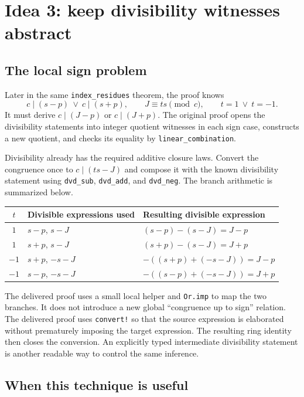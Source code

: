 \documentclass[11pt,letterpaper]{article}
\newcommand{\code}[1]{\nolinkurl{#1}}
\begin{document}
\section{Idea 3: keep divisibility witnesses abstract}

\subsection{The local sign problem}

Later in the same \code{index_residues} theorem, the proof knows
\[
 c\mid(s-p)\ \lor\ c\mid(s+p),
 \qquad J\equiv ts\pmod c,
 \qquad t=1\ \lor\ t=-1.
\]
It must derive $c\mid(J-p)$ or $c\mid(J+p)$. The original proof opens the
divisibility statements into integer quotient witnesses in each sign case,
constructs a new quotient, and checks its equality by
\code{linear_combination}.

Divisibility already has the required additive closure laws. Convert the
congruence once to $c\mid(ts-J)$ and compose it with the known divisibility
statement using \code{dvd_sub}, \code{dvd_add}, and \code{dvd_neg}. The branch
arithmetic is summarized below.

\begin{center}
\begin{tabular}{@{}cll@{}}
\toprule
$t$ & Divisible expressions used & Resulting divisible expression \\
\midrule
$1$ & $s-p$, $s-J$ & $(s-p)-(s-J)=J-p$ \\
$1$ & $s+p$, $s-J$ & $(s+p)-(s-J)=J+p$ \\
$-1$ & $s+p$, $-s-J$ & $-((s+p)+(-s-J))=J-p$ \\
$-1$ & $s-p$, $-s-J$ & $-((s-p)+(-s-J))=J+p$ \\
\bottomrule
\end{tabular}
\end{center}

The delivered proof uses a small local helper and \code{Or.imp} to map the two
branches. It does not introduce a new global ``congruence up to sign'' relation.
The delivered proof uses \code{convert!} so that the source expression is
elaborated without prematurely imposing the target expression. The resulting
ring identity then closes the conversion. An explicitly typed intermediate
divisibility statement is another readable way to control the same inference.


\subsection{When this technique is useful}
\end{document}
